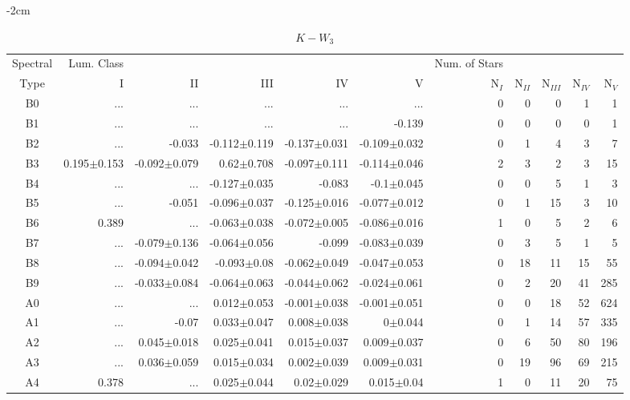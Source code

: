 \begin{table}[t]
\tiny
\centering
\caption{$K-W_{3}$}
\begin{center}
    \addtolength{\leftskip} {-2cm}
    \addtolength{\rightskip}{-2cm}
    \begin{tabular}{c|rrrrr|rrrrr}
    \toprule
    Spectral & Lum. Class & & & & & Num. of Stars & & & &  \\
    Type & I & II & III &  IV & V & N$_{I}$ & N$_{II}$ & N$_{III}$ & N$_{IV}$ & N$_{V}$ \\ \midrule
  
B0	&	 ...	&	 ...	&	 ...	&	 ...	&	 ...	&	0	&	0	&	0	&	1	&	1	\\
B1	&	 ...	&	 ...	&	 ...	&	 ...	&	-0.139	&	0	&	0	&	0	&	0	&	1	\\
B2	&	 ...	&	-0.033	&	-0.112$\pm$0.119	&	-0.137$\pm$0.031	&	-0.109$\pm$0.032	&	0	&	1	&	4	&	3	&	7	\\
B3	&	0.195$\pm$0.153	&	-0.092$\pm$0.079	&	0.62$\pm$0.708	&	-0.097$\pm$0.111	&	-0.114$\pm$0.046	&	2	&	3	&	2	&	3	&	15	\\
B4	&	 ...	&	 ...	&	-0.127$\pm$0.035	&	-0.083	&	-0.1$\pm$0.045	&	0	&	0	&	5	&	1	&	3	\\
B5	&	 ...	&	-0.051	&	-0.096$\pm$0.037	&	-0.125$\pm$0.016	&	-0.077$\pm$0.012	&	0	&	1	&	15	&	3	&	10	\\
B6	&	0.389	&	 ...	&	-0.063$\pm$0.038	&	-0.072$\pm$0.005	&	-0.086$\pm$0.016	&	1	&	0	&	5	&	2	&	6	\\
B7	&	 ...	&	-0.079$\pm$0.136	&	-0.064$\pm$0.056	&	-0.099	&	-0.083$\pm$0.039	&	0	&	3	&	5	&	1	&	5	\\
B8	&	 ...	&	-0.094$\pm$0.042	&	-0.093$\pm$0.08	&	-0.062$\pm$0.049	&	-0.047$\pm$0.053	&	0	&	18	&	11	&	15	&	55	\\
B9	&	 ...	&	-0.033$\pm$0.084	&	-0.064$\pm$0.063	&	-0.044$\pm$0.062	&	-0.024$\pm$0.061	&	0	&	2	&	20	&	41	&	285	\\
A0	&	 ...	&	 ...	&	0.012$\pm$0.053	&	-0.001$\pm$0.038	&	-0.001$\pm$0.051	&	0	&	0	&	18	&	52	&	624	\\
A1	&	 ...	&	-0.07	&	0.033$\pm$0.047	&	0.008$\pm$0.038	&	0$\pm$0.044	&	0	&	1	&	14	&	57	&	335	\\
A2	&	 ...	&	0.045$\pm$0.018	&	0.025$\pm$0.041	&	0.015$\pm$0.037	&	0.009$\pm$0.037	&	0	&	6	&	50	&	80	&	196	\\
A3	&	 ...	&	0.036$\pm$0.059	&	0.015$\pm$0.034	&	0.002$\pm$0.039	&	0.009$\pm$0.031	&	0	&	19	&	96	&	69	&	215	\\
A4	&	0.378	&	 ...	&	0.025$\pm$0.044	&	0.02$\pm$0.029	&	0.015$\pm$0.04	&	1	&	0	&	11	&	20	&	75	\\

\end{tabular}
\end{center}
\end{table}
